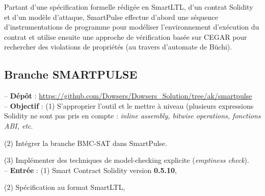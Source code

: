 \documentclass{article}
\begin{document}
\begin{flushleft}
Partant d'une spécification formelle rédigée en SmartLTL, d'un contrat Solidity et d'un modèle d'attaque, SmartPulse effectue d'abord une séquence d'instrumentations de programme pour modéliser l'environnement d'exécution du contrat et utilise ensuite une approche de vérification basée sur CEGAR pour rechercher des violations de propriétés (au travers d'automate de Büchi).

\end{flushleft}


\subsection{Branche SMARTPULSE}

\hspace{0.5cm}-- \textbf{Dépôt} : \url{https://github.com/Dowsers/Dowsers_Solution/tree/ak/smartpulse}\\


-- \textbf{Objectif} : (1) S'approprier l'outil et le mettre à niveau (plusieurs expressions Solidity ne sont pas pris en compte : \textit{inline assembly, bitwise operations, fonctions ABI, etc}.

\hspace{2.05cm} (2) Intégrer la branche BMC-SAT dans SmartPulse.

\hspace{2.05cm} (3) Implémenter des techniques de model-checking explicite (\textit{emptiness check}).\\

\hspace{-0.5cm}-- \textbf{Entrée} : (1) Smart Contract Solidity version \textbf{0.5.10},

\hspace{1.25cm} (2) Spécification au format SmartLTL,
\end{document}
